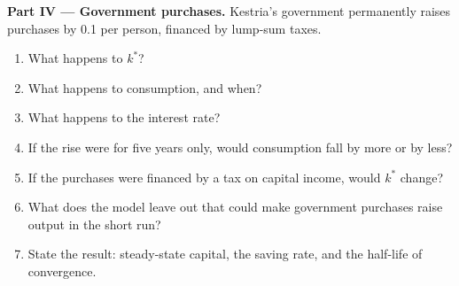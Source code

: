 \begin{problem}
\medskip
\noindent\textbf{Part IV --- Government purchases.} Kestria's government permanently raises purchases by 0.1 per person,
financed by lump-sum taxes.
\begin{enumerate}[resume]
  \item What happens to $k^*$?
  \item What happens to consumption, and when?
  \item What happens to the interest rate?
  \item If the rise were for five years only, would consumption fall by more or by less?
  \item If the purchases were financed by a tax on capital income, would $k^*$ change?
  \item What does the model leave out that could make government purchases raise output in the short run?
  \item State the result: steady-state capital, the saving rate, and the half-life of convergence.
\end{enumerate}
\end{problem}

